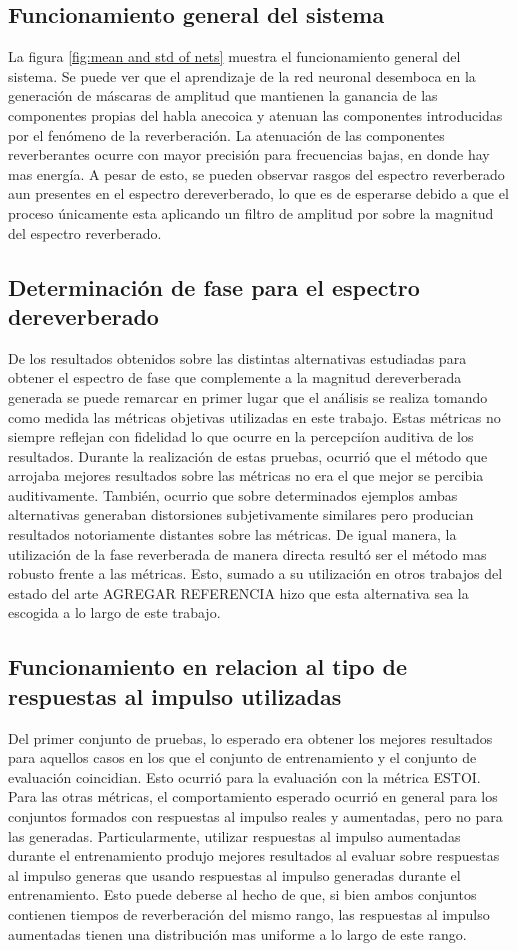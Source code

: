 \subsection{Funcionamiento general del sistema}
La figura \ref{fig:mean and std of nets} muestra el funcionamiento general del sistema. Se puede ver que el aprendizaje de la red neuronal desemboca en la generación de máscaras de amplitud que mantienen la ganancia de las componentes propias del habla anecoica y atenuan las componentes introducidas por el fenómeno de la reverberación. La atenuación de las componentes reverberantes ocurre con mayor precisión para frecuencias bajas, en donde hay mas energía. A pesar de esto, se pueden observar rasgos del espectro reverberado aun presentes en el espectro dereverberado, lo que es de esperarse debido a que el proceso únicamente esta aplicando un filtro de amplitud por sobre la magnitud del espectro reverberado.

\subsection{Determinación de fase para el espectro dereverberado}
De los resultados obtenidos sobre las distintas alternativas estudiadas para obtener el espectro de fase que complemente a la magnitud dereverberada generada se puede remarcar en primer lugar que el análisis se realiza tomando como medida las métricas objetivas utilizadas en este trabajo. Estas métricas no siempre reflejan con fidelidad lo que ocurre en la percepciíon auditiva de los resultados. Durante la realización de estas pruebas, ocurrió que el método que arrojaba mejores resultados sobre las métricas no era el que mejor se percibia auditivamente. También, ocurrio que sobre determinados ejemplos ambas alternativas generaban distorsiones subjetivamente similares pero producian resultados notoriamente distantes sobre las métricas. De igual manera, la utilización de la fase reverberada de manera directa resultó ser el método mas robusto frente a las métricas. Esto, sumado a su utilización en otros trabajos del estado del arte AGREGAR REFERENCIA hizo que esta alternativa sea la escogida a lo largo de este trabajo. 

\subsection{Funcionamiento en relacion al tipo de respuestas al impulso utilizadas}
Del primer conjunto de pruebas, lo esperado era obtener los mejores resultados para aquellos casos en los que el conjunto de entrenamiento y el conjunto de evaluación coincidian. Esto ocurrió para la evaluación con la métrica ESTOI. Para las otras métricas, el comportamiento esperado ocurrió en general para los conjuntos formados con respuestas al impulso reales y aumentadas, pero no para las generadas. Particularmente, utilizar respuestas al impulso aumentadas durante el entrenamiento produjo mejores resultados al evaluar sobre respuestas al impulso generas que usando respuestas al impulso generadas durante el entrenamiento. Esto puede deberse al hecho de que, si bien ambos conjuntos contienen tiempos de reverberación del mismo rango, las respuestas al impulso aumentadas tienen una distribución mas uniforme a lo largo de este rango.

